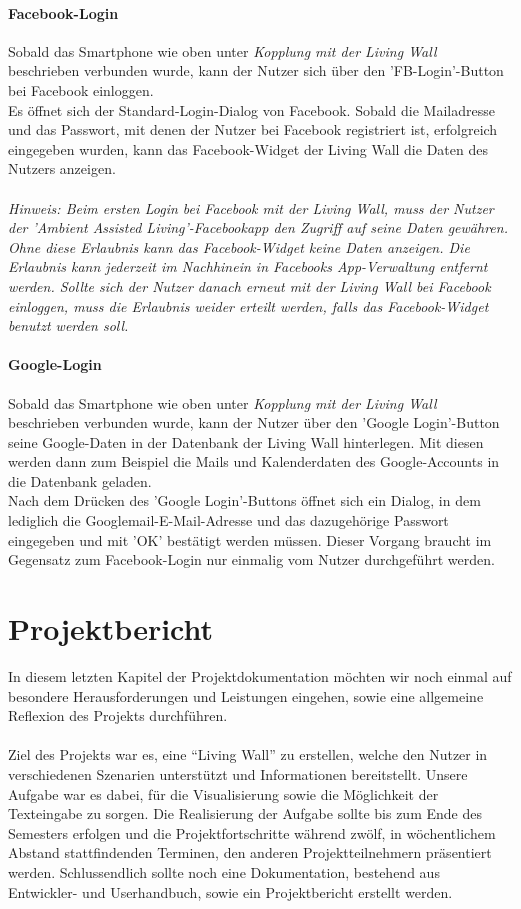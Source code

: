 \documentclass[10pt,a4paper]{report}
\begin{document}
		\subsubsection{Facebook-Login}
		Sobald das Smartphone wie oben unter \textit{Kopplung mit der Living Wall} beschrieben verbunden wurde, kann der Nutzer sich über den 'FB-Login'-Button bei Facebook einloggen.\\
Es öffnet sich der Standard-Login-Dialog von Facebook. Sobald die Mailadresse und das Passwort, mit denen der Nutzer bei Facebook registriert ist, erfolgreich eingegeben wurden, kann das Facebook-Widget der Living Wall die Daten des Nutzers anzeigen.\\\\
		\textit{Hinweis: Beim ersten Login bei Facebook mit der Living Wall, muss der Nutzer der 'Ambient Assisted Living'-Facebookapp den Zugriff auf seine Daten gewähren. Ohne diese Erlaubnis kann das Facebook-Widget keine Daten anzeigen. Die Erlaubnis kann jederzeit im Nachhinein in Facebooks App-Verwaltung entfernt werden. Sollte sich der Nutzer danach erneut mit der Living Wall bei Facebook einloggen, muss die Erlaubnis weider erteilt werden, falls das Facebook-Widget benutzt werden soll.}
		\subsubsection{Google-Login}
		Sobald das Smartphone wie oben unter \textit{Kopplung mit der Living Wall} beschrieben verbunden wurde, kann der Nutzer über den 'Google Login'-Button seine Google-Daten in der Datenbank der Living Wall hinterlegen. Mit diesen werden dann zum Beispiel die Mails und Kalenderdaten des Google-Accounts in die Datenbank geladen.\\
Nach dem Drücken des 'Google Login'-Buttons öffnet sich ein Dialog, in dem lediglich die Googlemail-E-Mail-Adresse und das dazugehörige Passwort eingegeben und mit 'OK' bestätigt werden müssen. Dieser Vorgang braucht im Gegensatz zum Facebook-Login nur einmalig vom Nutzer durchgeführt werden.

\chapter{Projektbericht}
	In diesem letzten Kapitel der Projektdokumentation möchten wir noch einmal auf besondere Herausforderungen und Leistungen eingehen, sowie eine allgemeine Reflexion des Projekts durchführen.\\\\
	Ziel des Projekts war es, eine "`Living Wall"' zu erstellen, welche den Nutzer in verschiedenen Szenarien unterstützt und Informationen bereitstellt. Unsere Aufgabe war es dabei, für die Visualisierung sowie die Möglichkeit der Texteingabe zu sorgen. Die Realisierung der Aufgabe sollte bis zum Ende des Semesters erfolgen und die Projektfortschritte während zwölf, in wöchentlichem Abstand stattfindenden Terminen, den anderen Projektteilnehmern präsentiert werden. Schlussendlich sollte noch eine Dokumentation, bestehend aus Entwickler- und Userhandbuch, sowie ein Projektbericht erstellt werden.
	
\end{document}
